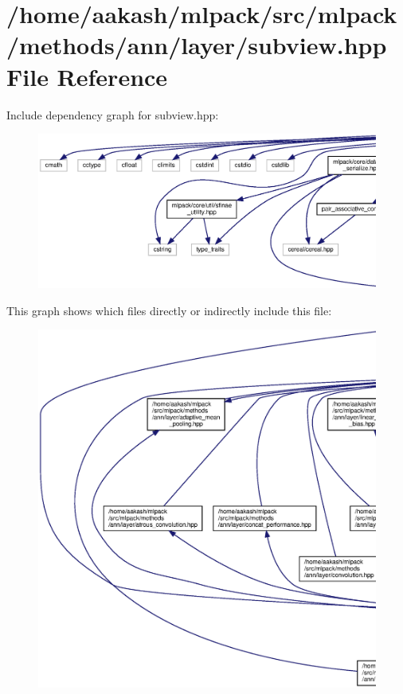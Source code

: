 \section{/home/aakash/mlpack/src/mlpack/methods/ann/layer/subview.hpp File Reference}
\label{subview_8hpp}
Include dependency graph for subview.\+hpp\+:
\nopagebreak
\begin{figure}[H]
\begin{center}
\leavevmode
\includegraphics[width=350pt]{subview_8hpp__incl}
\end{center}
\end{figure}
This graph shows which files directly or indirectly include this file\+:
\nopagebreak
\begin{figure}[H]
\begin{center}
\leavevmode
\includegraphics[width=350pt]{subview_8hpp__dep__incl}
\end{center}
\end{figure}
